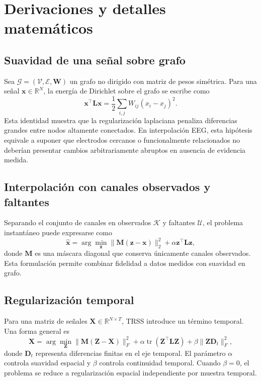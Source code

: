 \chapter{Derivaciones y detalles matemáticos}
\label{app:derivaciones}

\section{Suavidad de una señal sobre grafo}
Sea $\mathcal{G}=(\mathcal{V},\mathcal{E},\mathbf{W})$ un grafo no dirigido con matriz de pesos simétrica. Para una señal $\mathbf{x}\in\mathbb{R}^{N}$, la energía de Dirichlet sobre el grafo se escribe como
\begin{equation}
\mathbf{x}^{\top}\mathbf{L}\mathbf{x}=\frac{1}{2}\sum_{i,j} W_{ij}(x_i-x_j)^2.
\end{equation}
Esta identidad muestra que la regularización laplaciana penaliza diferencias grandes entre nodos altamente conectados. En interpolación EEG, esta hipótesis equivale a suponer que electrodos cercanos o funcionalmente relacionados no deberían presentar cambios arbitrariamente abruptos en ausencia de evidencia medida.

\section{Interpolación con canales observados y faltantes}
Separando el conjunto de canales en observados $\mathcal{K}$ y faltantes $\mathcal{U}$, el problema instantáneo puede expresarse como
\begin{equation}
\hat{\mathbf{x}}=\arg\min_{\mathbf{z}}\|\mathbf{M}(\mathbf{z}-\mathbf{x})\|_2^2+\alpha \mathbf{z}^{\top}\mathbf{L}\mathbf{z},
\end{equation}
donde $\mathbf{M}$ es una máscara diagonal que conserva únicamente canales observados. Esta formulación permite combinar fidelidad a datos medidos con suavidad en grafo.

\section{Regularización temporal}
Para una matriz de señales $\mathbf{X}\in\mathbb{R}^{N\times T}$, TRSS introduce un término temporal. Una forma general es
\begin{equation}
\hat{\mathbf{X}}=\arg\min_{\mathbf{Z}}\|\mathbf{M}(\mathbf{Z}-\mathbf{X})\|_F^2+\alpha\operatorname{tr}(\mathbf{Z}^{\top}\mathbf{L}\mathbf{Z})+\beta\|\mathbf{Z}\mathbf{D}_t\|_F^2,
\end{equation}
donde $\mathbf{D}_t$ representa diferencias finitas en el eje temporal. El parámetro $\alpha$ controla suavidad espacial y $\beta$ controla continuidad temporal. Cuando $\beta=0$, el problema se reduce a regularización espacial independiente por muestra temporal.

